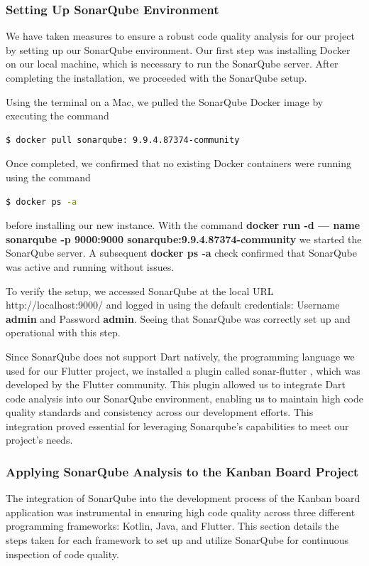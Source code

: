 \subsubsection{Setting Up SonarQube Environment}
We have taken measures to ensure a robust code quality analysis for our project by setting up our SonarQube environment. Our first step was installing Docker on our local machine, which is necessary to run the SonarQube server. After completing the installation, we proceeded with the SonarQube setup.
\par
Using the terminal on a Mac, we pulled the SonarQube Docker \cite{Docker} image by executing the command 
\begin{lstlisting}[language=bash]
    $ docker pull sonarqube: 9.9.4.87374-community 
  \end{lstlisting}
Once completed, we confirmed that no existing Docker containers were running using the command 
\begin{lstlisting}[language=bash]
    $ docker ps -a 
\end{lstlisting}
before installing our new instance. With the command \textbf{docker run -d — name sonarqube -p 9000:9000 sonarqube:9.9.4.87374-community} we started the SonarQube server. A subsequent \textbf{docker ps -a} check confirmed that SonarQube was active and running without issues.
\par
To verify the setup, we accessed SonarQube at the local URL http://localhost:9000/ and logged in using the default credentials: Username \textbf{admin} and Password \textbf{admin}. Seeing that SonarQube was correctly set up and operational with this step.
\par
Since SonarQube does not support Dart natively, the programming language we used for our Flutter project, we installed a plugin called sonar-flutter \cite{flutter_sonar}, which was developed by the Flutter community. This plugin allowed us to integrate Dart code analysis into our SonarQube environment, enabling us to maintain high code quality standards and consistency across our development efforts. This integration proved essential for leveraging Sonarqube's capabilities to meet our project's needs.
\subsubsection{Applying SonarQube Analysis to the Kanban Board Project}
The integration of SonarQube into the development process of the Kanban board application was instrumental in ensuring high code quality across three different programming frameworks: Kotlin, Java, and Flutter. This section details the steps taken for each framework to set up and utilize SonarQube for continuous inspection of code quality.

